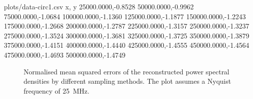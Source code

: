 \documentclass[a4paper, openany, oneside]{memoir}
\begin{document}
\begin{filecontents*}{plots/data-circ1.csv}
x, y
25000.0000,-0.8528
50000.0000,-0.9962
75000.0000,-1.0684
100000.0000,-1.1360
125000.0000,-1.1877
150000.0000,-1.2243
175000.0000,-1.2668
200000.0000,-1.2787
225000.0000,-1.3157
250000.0000,-1.3237
275000.0000,-1.3524
300000.0000,-1.3681
325000.0000,-1.3725
350000.0000,-1.3879
375000.0000,-1.4151
400000.0000,-1.4440
425000.0000,-1.4555
450000.0000,-1.4564
475000.0000,-1.4693
500000.0000,-1.4749
\end{filecontents*}
\begin{figure}
	\centering
	\caption{Normalised mean squared errors of the reconstructed power spectral densities by different sampling methods. The plot assumes a Nyquist frequency of \SI{25}{MHz}.}
	\label{fig:plot-nmse}
\end{figure}
\end{document}
